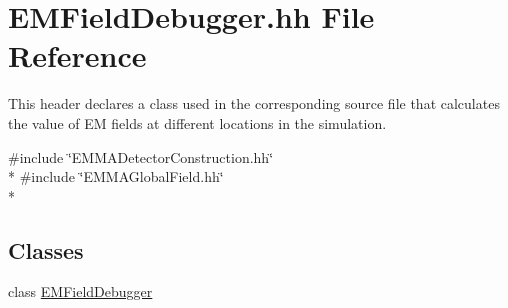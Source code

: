 \hypertarget{EMFieldDebugger_8hh}{\section{E\-M\-Field\-Debugger.\-hh File Reference}
\label{EMFieldDebugger_8hh}
}


This header declares a class used in the corresponding source file that calculates the value of E\-M fields at different locations in the simulation.  


{\ttfamily \#include \char`\"{}E\-M\-M\-A\-Detector\-Construction.\-hh\char`\"{}}\\*
{\ttfamily \#include \char`\"{}E\-M\-M\-A\-Global\-Field.\-hh\char`\"{}}\\*
\subsection*{Classes}
\begin{DoxyCompactItemize}
\item 
class \hyperlink{classEMFieldDebugger}{E\-M\-Field\-Debugger}
\end{DoxyCompactItemize}
